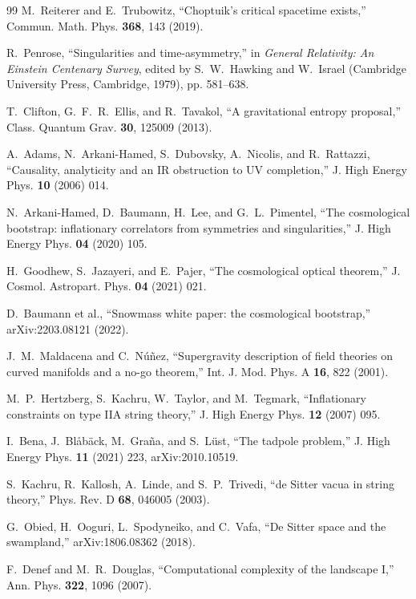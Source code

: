 \documentclass[11pt,letterpaper]{article}
\begin{document}
\begin{thebibliography}{99}
 M.~Reiterer and E.~Trubowitz, ``Choptuik's critical spacetime exists,'' Commun. Math. Phys. \textbf{368}, 143 (2019).

 R.~Penrose, ``Singularities and time-asymmetry,'' in \emph{General Relativity: An Einstein Centenary Survey}, edited by S.~W.~Hawking and W.~Israel (Cambridge University Press, Cambridge, 1979), pp. 581--638.

 T.~Clifton, G.~F.~R.~Ellis, and R.~Tavakol, ``A gravitational entropy proposal,'' Class. Quantum Grav. \textbf{30}, 125009 (2013).

 A.~Adams, N.~Arkani-Hamed, S.~Dubovsky, A.~Nicolis, and R.~Rattazzi, ``Causality, analyticity and an IR obstruction to UV completion,'' J. High Energy Phys. \textbf{10} (2006) 014.

 N.~Arkani-Hamed, D.~Baumann, H.~Lee, and G.~L.~Pimentel, ``The cosmological bootstrap: inflationary correlators from symmetries and singularities,'' J. High Energy Phys. \textbf{04} (2020) 105.

 H.~Goodhew, S.~Jazayeri, and E.~Pajer, ``The cosmological optical theorem,'' J. Cosmol. Astropart. Phys. \textbf{04} (2021) 021.

 D.~Baumann et al., ``Snowmass white paper: the cosmological bootstrap,'' arXiv:2203.08121 (2022).

 J.~M.~Maldacena and C.~N\'u\~nez, ``Supergravity description of field theories on curved manifolds and a no-go theorem,'' Int. J. Mod. Phys. A \textbf{16}, 822 (2001).

 M.~P.~Hertzberg, S.~Kachru, W.~Taylor, and M.~Tegmark, ``Inflationary constraints on type IIA string theory,'' J. High Energy Phys. \textbf{12} (2007) 095.

 I.~Bena, J.~Bl\aa b\"ack, M.~Gra\~na, and S.~L\"ust, ``The tadpole problem,'' J. High Energy Phys. \textbf{11} (2021) 223, arXiv:2010.10519.

 S.~Kachru, R.~Kallosh, A.~Linde, and S.~P.~Trivedi, ``de Sitter vacua in string theory,'' Phys. Rev. D \textbf{68}, 046005 (2003).

 G.~Obied, H.~Ooguri, L.~Spodyneiko, and C.~Vafa, ``De Sitter space and the swampland,'' arXiv:1806.08362 (2018).

 F.~Denef and M.~R.~Douglas, ``Computational complexity of the landscape I,'' Ann. Phys. \textbf{322}, 1096 (2007).


\end{thebibliography}
\end{document}
